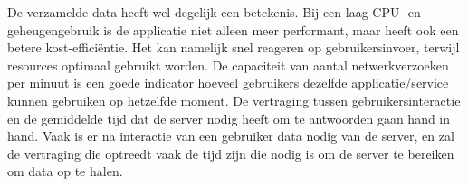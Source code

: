 De verzamelde data heeft wel degelijk een betekenis. Bij een laag CPU- en geheugengebruik is de applicatie niet alleen meer performant, maar heeft ook een betere kost-efficiëntie. Het kan namelijk snel reageren op gebruikersinvoer, terwijl resources optimaal gebruikt worden.
De capaciteit van aantal netwerkverzoeken per minuut is een goede indicator hoeveel gebruikers dezelfde applicatie/service kunnen gebruiken op hetzelfde moment. De vertraging tussen gebruikersinteractie en de gemiddelde tijd dat de server nodig heeft om te antwoorden gaan hand in hand. Vaak is er na interactie van een gebruiker data nodig van de server, en zal de vertraging die optreedt vaak de tijd zijn die nodig is om de server te bereiken om data op te halen. 


%
%
%
%



